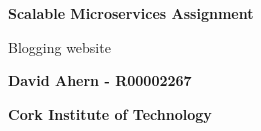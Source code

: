 \begin{titlepage}
    \begin{center}
    	
        \vspace*{1cm}
        
        \textbf{Scalable Microservices Assignment}
        
        \vspace{0.5cm}
        Blogging website
        
        \vspace{1.5cm}
        
        \textbf{David Ahern - R00002267}
        
        \vspace{0.5cm}
        \textbf{Cork Institute of Technology}
        
    \end{center}
\end{titlepage}